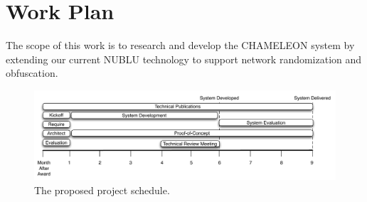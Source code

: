 \documentclass{sbir}
\begin{document}
\newpage
\clearpage
\cfoot{\color{LeTigre}\vspace*{-1.25em}{\scshape\fromproposaltitle}~\\ \rm\thepage~\\ 
\it{}}

\section{Work Plan}{The scope of this work is to research and develop the CHAMELEON system by extending our current NUBLU technology to support network randomization and obfuscation.}

\begin{figure}[!t]
\centering
\includegraphics[width=\textwidth]{images/gantt.pdf}
\caption{The proposed project schedule.}
\label{fig:gantt}
\end{figure}
\end{document}
